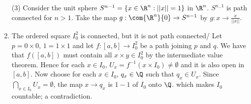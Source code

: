 \begin{example}
\begin{enumerate}
    \item[(3)] Consider the unit sphere $S^{n-1}=\{x \in \R^n:||x||=1\}$ in $\R^n$.  $S^{n_-1}$ is path
        connected for $n>1$. Take the map  $g:\com{\R^n}\{0\} \rightarrow S^{n-1}$ by $g:x
        \rightarrow \frac{x}{||x||}$.

    \item The ordered square $ I_0^2$ is connected, but it is not path connected/ Let $p=0 \times
        0$,  $1=1 \times 1$ and let  $f:[a,b] \rightarrow I_0^2$ be a path joining $p$ and  $q$. We
        have that  $f([a,b])$ must contain all $x \times y \in I_0^2$ by the intermediate value
        theorem. Hence for each  $x \in I_0$, $U_x=f^{-1}(x \times I_0) \neq \emptyset$ and it is
        also open in $[a,b]$. Now choose for each $x \in I_0$, $q_x \in \Q$ such that  $q_x \in
        U_x$. Since  $\bigcap_{x \in I_0}{U_x} = \emptyset$, the map $x \rightarrow q_x$ is  $1-1$
        of  $I_0$ onto $\Q$. which makes $I_0$ countable; a contradiction.


\end{enumerate}
\end{example}
